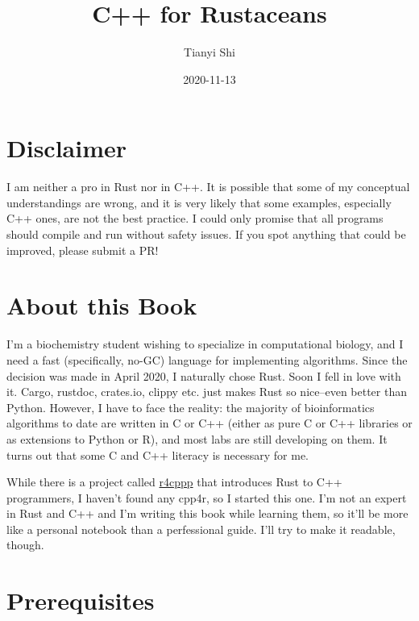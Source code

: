 \documentclass[
]{book}
\title{C++ for Rustaceans}
\author{Tianyi Shi}
\date{2020-11-13}
\begin{document}
\maketitle

{
\setcounter{tocdepth}{1}
\tableofcontents
}
\hypertarget{disclaimer}{%
\chapter*{Disclaimer}\label{disclaimer}}

I am neither a pro in Rust nor in C++. It is possible that some of my conceptual understandings are wrong, and it is very likely that some examples, especially C++ ones, are not the best practice. I could only promise that all programs should compile and run without safety issues. If you spot anything that could be improved, please submit a PR!

\hypertarget{about-this-book}{%
\chapter*{About this Book}\label{about-this-book}}

I'm a biochemistry student wishing to specialize in computational biology, and I need a fast (specifically, no-GC) language for implementing algorithms. Since the decision was made in April 2020, I naturally chose Rust. Soon I fell in love with it. Cargo, rustdoc, crates.io, clippy etc. just makes Rust so nice--even better than Python. However, I have to face the reality: the majority of bioinformatics algorithms to date are written in C or C++ (either as pure C or C++ libraries or as extensions to Python or R), and most labs are still developing on them. It turns out that some C and C++ literacy is necessary for me.

While there is a project called \href{https://github.com/nrc/r4cppp}{r4cppp} that introduces Rust to C++ programmers, I haven't found any cpp4r, so I started this one. I'm not an expert in Rust and C++ and I'm writing this book while learning them, so it'll be more like a personal notebook than a perfessional guide. I'll try to make it readable, though.

\hypertarget{prerequisites}{%
\chapter*{Prerequisites}\label{prerequisites}}
\end{document}
